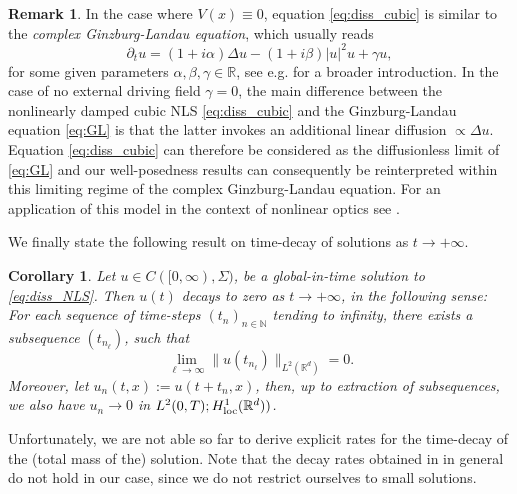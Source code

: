 \documentclass[a4paper,leqno]{amsart}
\theoremstyle{plain}
\newtheorem{corollary}[theorem]{Corollary}
\theoremstyle{definition}
\newtheorem{remark}[theorem]{Remark}
\numberwithin{equation}{section}
\begin{document}
\begin{remark} In the case where $V (x) \equiv 0$, equation \eqref{eq:diss_cubic} is similar to the \emph{complex Ginzburg-Landau equation}, which usually reads
\begin{equation}\label{eq:GL}
{\partial}_t u = (1 + i \alpha)\Delta u  - (1 + i\beta)|u |^2 u + \gamma u,
\end{equation}
for some given parameters $\alpha, \beta, \gamma \in {{\mathbb R}}$, see e.g. \cite{AK} for a broader introduction. In the case of no external driving field $\gamma = 0$, the main difference 
between the nonlinearly damped cubic NLS \eqref{eq:diss_cubic} and the
Ginzburg-Landau equation \eqref{eq:GL} is that the latter invokes an additional linear diffusion $\propto  \Delta u$. Equation \eqref{eq:diss_cubic} can therefore be considered as the  
diffusionless limit of \eqref{eq:GL} and our well-posedness results can consequently be reinterpreted within this limiting regime of the complex Ginzburg-Landau equation. For an application 
of this model in the context of nonlinear optics see \cite{SaMa}.
\end{remark}
We finally state the following result on time-decay of solutions as $t\to + \infty$.
\begin{corollary}\label{cor:decay}
Let $u \in C([0, \infty), \Sigma)$, be a global-in-time solution to \eqref{eq:diss_NLS}.
Then $u(t)$ decays to zero as $t \to + \infty$, in the following sense:
For each sequence of time-steps $(t_n)_{n\in {{\mathbb N}}}$ tending to infinity, there exists a subsequence $(t_{n_\ell})$, such that
\begin{equation}\label{decay}
\lim_{\ell \to \infty} \|u(t_{n_\ell}) \|_{L^2({{\mathbb R}}^d)} = 0.
\end{equation}
Moreover, let $u_n(t,x):=u(t+t_n,x)$, then, up to extraction of subsequences, we also have $u_n \to 0$ in $ L^2(0,T);H^1_{\rm loc}({{\mathbb R}}^d))$.
\end{corollary}
Unfortunately, we are not able so far to derive explicit rates for the time-decay of the (total mass of the) solution.
Note that the decay rates obtained in \cite{KiShi, Shi} in general do not hold in our case,
since we do not restrict ourselves to small solutions.
\end{document}
